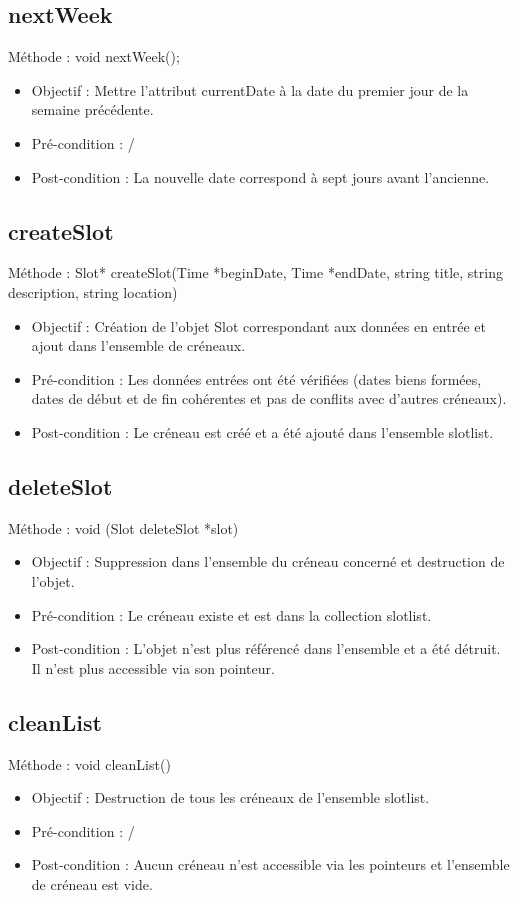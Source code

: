    		\subsection*{nextWeek}
            Méthode : void nextWeek();
			\begin{itemize}
				\item Objectif  : Mettre l'attribut currentDate à la date du premier jour de la semaine précédente.
				\item Pré-condition : /
				\item Post-condition : La nouvelle date correspond à sept jours avant l'ancienne.
			\end{itemize}
   		\subsection*{createSlot}
            Méthode : Slot* createSlot(Time *beginDate, Time *endDate, string title, string description, string location)
			\begin{itemize}
				\item Objectif  : Création de l'objet Slot correspondant aux données en entrée et ajout dans l'ensemble de créneaux.
				\item Pré-condition : Les données entrées ont été vérifiées (dates biens formées, dates de début et de fin cohérentes et pas de conflits avec d'autres créneaux).
				\item Post-condition : Le créneau est créé et a été ajouté dans l'ensemble slotlist.
			\end{itemize}
            
   		\subsection*{deleteSlot}
            Méthode : void (Slot deleteSlot *slot)
			\begin{itemize}
				\item Objectif  : Suppression dans l'ensemble du créneau concerné et destruction de l'objet.
				\item Pré-condition : Le créneau existe et est dans la collection slotlist.
				\item Post-condition : L'objet n'est plus référencé dans l'ensemble et a été détruit. Il n'est plus accessible via son pointeur.
			\end{itemize}
            
   		\subsection*{cleanList}
            Méthode : void cleanList()
			\begin{itemize}
				\item Objectif  : Destruction de tous les créneaux de l'ensemble slotlist.
				\item Pré-condition : /
				\item Post-condition : Aucun créneau n'est accessible via les pointeurs et l'ensemble de créneau est vide.
			\end{itemize}
            
